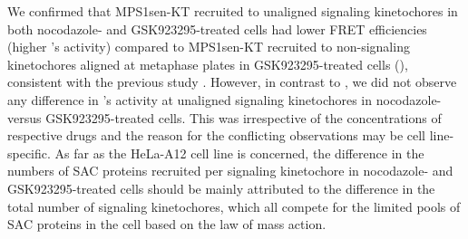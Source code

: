 We confirmed that MPS1sen-KT recruited to unaligned signaling kinetochores in both nocodazole- and GSK923295-treated cells had lower FRET efficiencies (higher 's activity) compared to MPS1sen-KT recruited to non-signaling kinetochores aligned at metaphase plates in GSK923295-treated cells (), consistent with the previous study \cite{MPS1senor}. However, in contrast to \cite{MPS1senor}, we did not observe any difference in 's activity at unaligned signaling kinetochores in nocodazole- versus GSK923295-treated cells. This was irrespective of the concentrations of respective drugs and the reason for the conflicting observations may be cell line-specific. As far as the HeLa-A12 cell line is concerned, the difference in the numbers of SAC proteins recruited per signaling kinetochore in nocodazole- and GSK923295-treated cells should be mainly attributed to the difference in the total number of signaling kinetochores, which all compete for the limited pools of SAC proteins in the cell based on the law of mass action.


